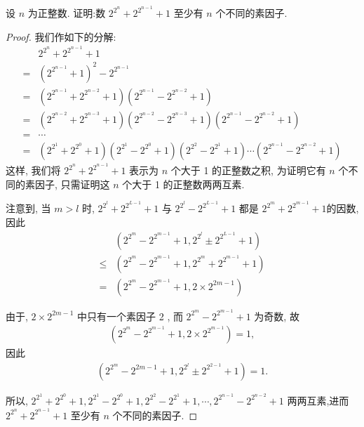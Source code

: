 \begin{example}
	设 $n$ 为正整数. 证明:数 $2^{2^{n}}+2^{2^{n-1}}+1$ 至少有 $n$ 个不同的素因子.
\end{example}
\begin{proof}
	我们作如下的分解:
	\begin{align*}
		  & 2^{2^{n}}+2^{2^{n-1}}+1                                                                                                                             \\
		= & \left(2^{2^{n-1}}+1\right)^{2}-2^{2^{n-1}}                                                                                                          \\
		= & \left(2^{2^{n-1}}+2^{2^{n-2}}+1\right)\left(2^{2^{n-1}}-2^{2^{n-2}}+1\right)                                                                        \\
		= & \left(2^{2^{n-2}}+2^{2^{n-3}}+1\right)\left(2^{2^{n-2}}-2^{2^{n-3}}+1\right)\left(2^{2^{n-1}}-2^{2^{n-2}}+1\right)                                  \\
		= & \cdots                                                                                                                                              \\
		= & \left(2^{2^{1}}+2^{2^{0}}+1\right)\left(2^{2^{1}}-2^{2^{0}}+1\right)\left(2^{2^{2}}-2^{2^{1}}+1\right) \cdots\left(2^{2^{n-1}}-2^{2^{n-2}}+1\right)
	\end{align*}
	这样, 我们将 $2^{2^{n}}+2^{2^{n-1}}+1$ 表示为 $n$ 个大于 1 的正整数之积, 为证明它有 $n$ 个不同的素因子, 只需证明这 $n$ 个大于 1 的正整数两两互素.

	注意到, 当 $m>l$ 时, $2^{2^{l}}+2^{2^{L-1}}+1$ 与 $2^{2^{l}}-2^{2^{L-1}}+1$ 都是 $2^{2^{m}}+2^{2^{m-1}}+1$的因数, 因此
	\begin{align}
		          & \left(2^{2^{m}}-2^{2^{m-1}}+1,2^{2^{l}} \pm 2^{2^{L-1}}+1\right) \\
		\leqslant & \left(2^{2^{m}}-2^{2^{m-1}}+1,2^{2^{m}}+2^{2^{m-1}}+1\right)     \\
		=         & \left(2^{2^{m}}-2^{2^{m-1}}+1,2 \times 2^{2 m-1}\right)
	\end{align}

	由于, $2 \times 2^{2 m-1}$ 中只有一个素因子 2 , 而 $2^{2^{m}}-2^{2^{m-1}}+1$ 为奇数, 故
	\begin{align*}
		\left(2^{2^{m}}-2^{2^{m-1}}+1,2 \times 2^{2^{m-1}}\right)=1,
	\end{align*}
	因此
	\begin{align*}
		\left(2^{2^{m}}-2^{2 m-1}+1,2^{2^{l}} \pm 2^{2^{2-1}}+1\right)=1 .
	\end{align*}

	所以, $2^{2^{1}}+2^{2^{0}}+1,2^{2^{1}}-2^{2^{0}}+1,2^{2^{2}}-2^{2^{1}}+1, \cdots, 2^{2^{n-1}}-2^{2^{n-2}}+1$ 两两互素,进而 $2^{2^{n}}+2^{2^{n-1}}+1$ 至少有 $n$ 个不同的素因子.
\end{proof}

